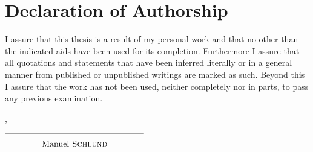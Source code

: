 


\chapter{Declaration of Authorship}

I assure that this thesis is a result of my personal work and that no other
than the indicated aids have been used for its completion. Furthermore I assure
that all quotations and statements that have been inferred literally or in a
general manner from published or unpublished writings are marked as such.
Beyond this I assure that the work has not been used, neither completely nor in
parts, to pass any previous examination.

\vspace{20mm}

\noindent \thePlace{}, \theDate{}

\begin{flushright}
  $\overline{~~~~~~~~~~~~~\raisebox{0mm}[5mm]{\theAuthor{}}~~~~~~~~~~~~~}$
\end{flushright}